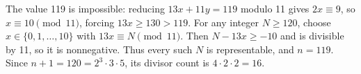 The value 119 is impossible: reducing $ 13x+11y=119 $ modulo 11 gives $ 2x\equiv9 $, so $ x\equiv10\pmod{11}$, forcing $ 13x\ge130>119 $. For any integer $ N\ge120 $, choose $ x\in\{0,1,\ldots,10\}$ with $ 13x\equiv N\pmod{11}$. Then $ N-13x\ge-10 $ and is divisible by 11, so it is nonnegative. Thus every such $ N $ is representable, and $ n=119 $. Since $ n+1=120=2^3\cdot3\cdot5 $, its divisor count is $ 4\cdot2\cdot2=\boxed{16}$.
